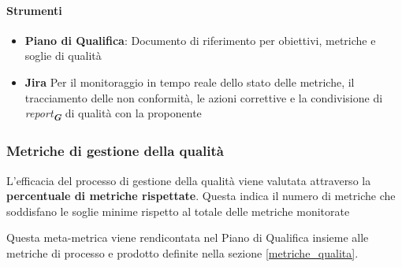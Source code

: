 \documentclass[a4paper,12pt]{article}
\newcommand{\glossario}[1]{\textit{#1}\textsubscript{\textbf{\textit{\textcolor{lightblack}{G}}}}}
\begin{document}
\paragraph{Strumenti}\label{strumenti_gestione_qualita}
\begin{itemize}
    \item \textbf{Piano di Qualifica}: Documento di riferimento per obiettivi, metriche e soglie di qualità
    \item \textbf{Jira} Per il monitoraggio in tempo reale dello stato delle metriche,
          il tracciamento delle non conformità, le azioni correttive e la condivisione di \glossario{report} di qualità con la proponente
\end{itemize}

\subsubsection{Metriche di gestione della qualità}\label{metriche_gestione_qualita}
L'efficacia del processo di gestione della qualità viene valutata attraverso la
\textbf{percentuale di metriche rispettate}. Questa indica il numero di
metriche che soddisfano le soglie minime rispetto al totale delle metriche
monitorate

Questa meta-metrica viene rendicontata nel Piano di Qualifica insieme alle
metriche di processo e prodotto definite nella sezione \ref{metriche_qualita}.
\end{document}
